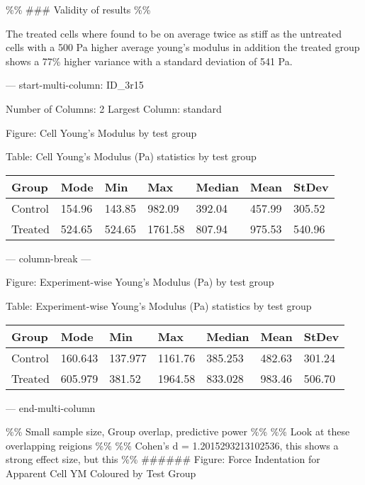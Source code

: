 \documentclass[
  paper=a4,
  ,captions=tableheading
]{scrartcl}
\newenvironment{Shaded}{}{}
\newcommand{\NormalTok}[1]{#1}
\begin{document}
\%\% \#\#\# Validity of results \%\%

The treated cells where found to be on average twice as stiff as the
untreated cells with a 500 Pa higher average young's modulus in addition
the treated group shows a 77\% higher variance with a standard deviation
of 541 Pa.

--- start-multi-column: ID\_3r15

\begin{Shaded}
\begin{Highlighting}[]
\NormalTok{Number of Columns: 2}
\NormalTok{Largest Column: standard}
\end{Highlighting}
\end{Shaded}

Figure: Cell Young's Modulus by test group

{}

Table: Cell Young's Modulus (Pa) statistics by test group

\begin{longtable}[]{@{}lllllll@{}}
\toprule\noalign{}
Group & Mode & Min & Max & Median & Mean & StDev \\
\midrule\noalign{}
\endhead
\bottomrule\noalign{}
\endlastfoot
Control & 154.96 & 143.85 & 982.09 & 392.04 & 457.99 & 305.52 \\
Treated & 524.65 & 524.65 & 1761.58 & 807.94 & 975.53 & 540.96 \\
\end{longtable}

--- column-break ---

Figure: Experiment-wise Young's Modulus (Pa) by test group

{}

Table: Experiment-wise Young's Modulus (Pa) statistics by test group

\begin{longtable}[]{@{}lllllll@{}}
\toprule\noalign{}
Group & Mode & Min & Max & Median & Mean & StDev \\
\midrule\noalign{}
\endhead
\bottomrule\noalign{}
\endlastfoot
Control & 160.643 & 137.977 & 1161.76 & 385.253 & 482.63 & 301.24 \\
Treated & 605.979 & 381.52 & 1964.58 & 833.028 & 983.46 & 506.70 \\
\end{longtable}

--- end-multi-column

\%\% Small sample size, Group overlap, predictive power \%\% \%\% Look
at these overlapping reigions \%\% \%\% Cohen's d = 1.2015293213102536,
this shows a strong effect size, but this \%\% \#\#\#\#\#\# Figure:
Force Indentation for Apparent Cell YM Coloured by Test Group
\end{document}
